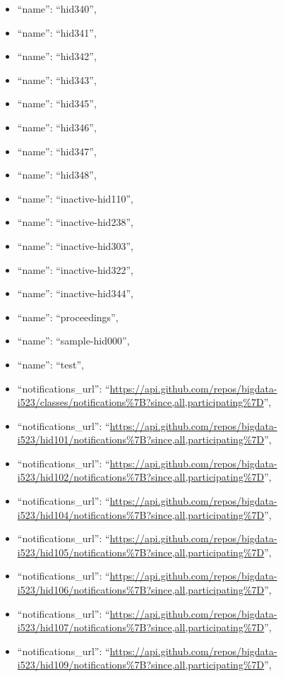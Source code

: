 \begin{itemize}
\item
  ``name'': ``hid340'',
\item
  ``name'': ``hid341'',
\item
  ``name'': ``hid342'',
\item
  ``name'': ``hid343'',
\item
  ``name'': ``hid345'',
\item
  ``name'': ``hid346'',
\item
  ``name'': ``hid347'',
\item
  ``name'': ``hid348'',
\item
  ``name'': ``inactive-hid110'',
\item
  ``name'': ``inactive-hid238'',
\item
  ``name'': ``inactive-hid303'',
\item
  ``name'': ``inactive-hid322'',
\item
  ``name'': ``inactive-hid344'',
\item
  ``name'': ``proceedings'',
\item
  ``name'': ``sample-hid000'',
\item
  ``name'': ``test'',
\item
  ``notifications\_url'':
  ``\url{https://api.github.com/repos/bigdata-i523/classes/notifications\%7B?since,all,participating\%7D}'',
\item
  ``notifications\_url'':
  ``\url{https://api.github.com/repos/bigdata-i523/hid101/notifications\%7B?since,all,participating\%7D}'',
\item
  ``notifications\_url'':
  ``\url{https://api.github.com/repos/bigdata-i523/hid102/notifications\%7B?since,all,participating\%7D}'',
\item
  ``notifications\_url'':
  ``\url{https://api.github.com/repos/bigdata-i523/hid104/notifications\%7B?since,all,participating\%7D}'',
\item
  ``notifications\_url'':
  ``\url{https://api.github.com/repos/bigdata-i523/hid105/notifications\%7B?since,all,participating\%7D}'',
\item
  ``notifications\_url'':
  ``\url{https://api.github.com/repos/bigdata-i523/hid106/notifications\%7B?since,all,participating\%7D}'',
\item
  ``notifications\_url'':
  ``\url{https://api.github.com/repos/bigdata-i523/hid107/notifications\%7B?since,all,participating\%7D}'',
\item
  ``notifications\_url'':
  ``\url{https://api.github.com/repos/bigdata-i523/hid109/notifications\%7B?since,all,participating\%7D}'',

\end{itemize}

